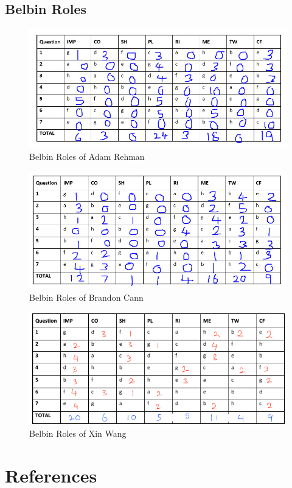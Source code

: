 \documentclass[12pt,a4paper]{article}
\begin{document}
\subsection{Belbin Roles}
\begin{figure} [h!]
	\centering
	\includegraphics[scale=0.5]{Adam.PNG}
	\caption{Belbin Roles of Adam Rehman}
\end{figure}
\begin{figure} [h!]
	\centering
	\includegraphics[scale=0.5]{Brandon.PNG}
	\caption{Belbin Roles of Brandon Cann}
\end{figure}
\begin{figure} [h!]
	\centering
	\includegraphics[scale=0.75]{Xin.PNG}
	\caption{Belbin Roles of Xin Wang}
\end{figure}
\pagebreak

\section{References}
\printbibliography
\end{document}
